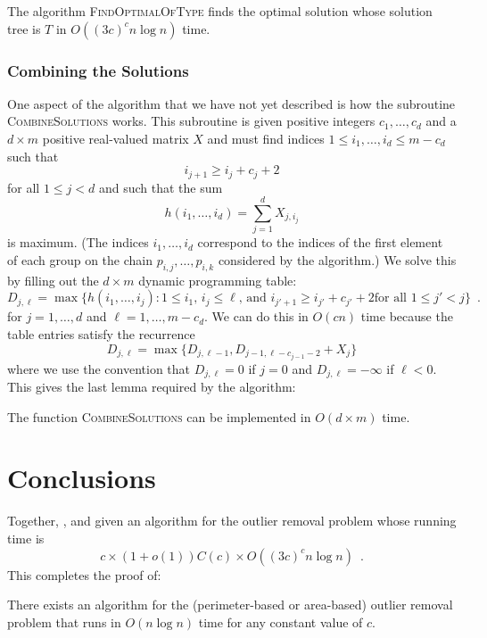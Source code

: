 \documentclass[lotsofwhite]{patmorin}
\begin{document}
\begin{lem}
The algorithm \textsc{FindOptimalOfType} finds the optimal solution
whose solution tree is $T$ in $O((3c)^c n\log n)$ time.
\end{lem}


\subsubsection{Combining the Solutions}

One aspect of the algorithm that we have not yet described is how the
subroutine \textsc{CombineSolutions} works.  This subroutine is given
positive integers $c_1,\ldots,c_d$ and a $d\times m$ positive
real-valued matrix $X$ and must find indices $1\le i_1,\ldots,i_d \le
m-c_d$ such that
\[
     i_{j+1} \ge i_j + c_j + 2
\]
for all $1\le j < d$ and such that the sum
\[
      h(i_1,\ldots,i_d)=\sum_{j=1}^d X_{j,i_j}
\]
is maximum.  (The indices $i_1,\ldots,i_d$ correspond to the indices of the
first element of each group on the chain $p_{i,j},\ldots,p_{i,k}$
considered by the algorithm.)
We solve this by filling out the $d\times m$ dynamic
programming table:
\[
     D_{j,\ell} = \max\{h(i_1,\ldots,i_j):
      \mbox{$1\le i_1$, $i_j\le \ell$, and $i_{j'+1} \ge i_{j'}+c_{j'}+2$
             for all $1\le j'< j$}  \} \enspace .
\]
for $j=1,\ldots,d$ and $\ell=1,\ldots,m-c_d$.  We can do this in
$O(cn)$ time because the table entries satisfy the recurrence
\[
     D_{j,\ell} = \max\{D_{j,\ell-1},D_{j-1,\ell-c_{j-1}-2}+X_j \}
\]
where we use the convention that $D_{j,\ell} = 0$ if $j=0$ and
$D_{j,\ell}=-\infty$ if $\ell<0$.  This gives the last lemma required
by the algorithm:

\begin{lem}
The function \textsc{CombineSolutions} can be implemented in
$O(d\times m)$ time.
\end{lem}


\section{Conclusions}

Together, ,  and 
given an algorithm for the outlier removal problem whose running time
is
\[
    c \times (1+o(1))C(c) \times O((3c)^cn\log n) \enspace .
\]
This completes the proof of:
\begin{thm}
There exists an algorithm for the (perimeter-based or area-based)
outlier removal problem that runs in $O(n\log n)$ time for any
constant value of $c$.
\end{thm}
\end{document}
